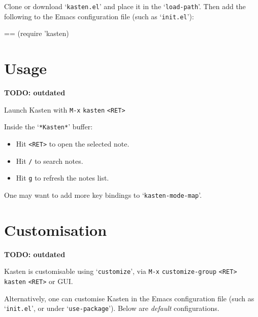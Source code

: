 \documentclass{book}
\makeatletter
\newenvironment{Texinfopreformatted}{%
  \par\GNUTobeylines\obeyspaces\frenchspacing\parskip=\z@\parindent=\z@}{}
{\catcode`\^^M=13 \gdef\GNUTobeylines{\catcode`\^^M=13 \def^^M{\null\par}}}
\newenvironment{Texinfoindented}{\begin{list}{}{}\item\relax}{\end{list}}
\renewcommand{\_}{\Texinfounderscore\discretionary{}{}{}}
\makeatother
\begin{document}
Clone or download `\texttt{kasten.el}' and place it in the `\texttt{load-path}'. Then add the
following to the Emacs configuration file (such as `\texttt{init.el}'):

\begin{Texinfoindented}
\begin{Texinfopreformatted}%
\ttfamily (require 'kasten)
\end{Texinfopreformatted}
\end{Texinfoindented}

\chapter{{Usage}}
\label{anchor:Usage}%

\textbf{TODO: outdated}

Launch Kasten with \texttt{M-x} \texttt{kasten} \texttt{<RET>}

Inside the `\texttt{*Kasten*}' buffer:
\begin{itemize}
\item Hit \texttt{<RET>} to open the selected note.
\item Hit \texttt{/} to search notes.
\item Hit \texttt{g} to refresh the notes list.
\end{itemize}

One may want to add more key bindings to `\texttt{kasten-mode-map}'.

\chapter{{Customisation}}
\label{anchor:Customisation}%

\textbf{TODO: outdated}

Kasten is customisable using `\texttt{customize}', via \texttt{M-x} \texttt{customize-group} \texttt{<RET>}
\texttt{kasten} \texttt{<RET>} or GUI\@.

Alternatively, one can customise Kasten in the Emacs configuration file (such as
`\texttt{init.el}', or under `\texttt{use-package}'). Below are \emph{default} configurations.
\end{document}
